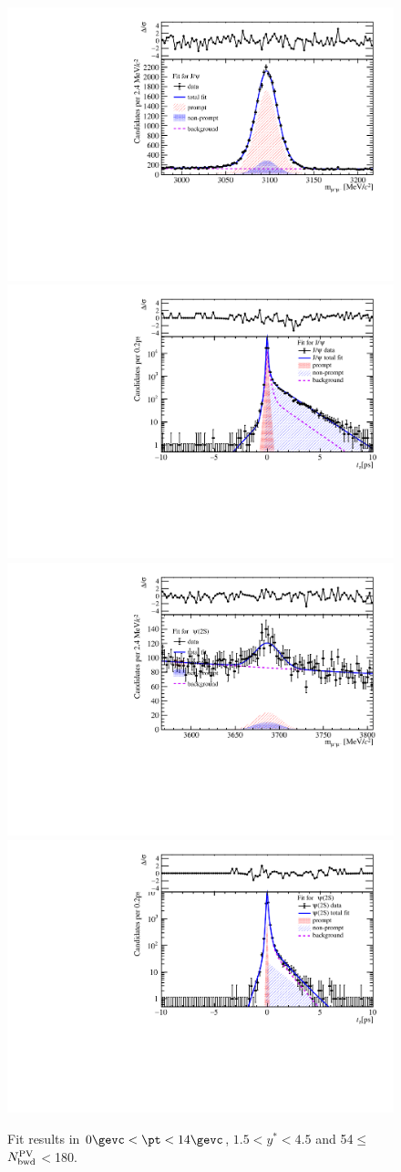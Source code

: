 \begin{figure}[H]
\begin{center}
\includegraphics[width=0.45\linewidth]{pdf/pPb/BWorkdir/TwoDimFit/ProjMass/Jpsi_n5y1pt1.pdf}
\includegraphics[width=0.45\linewidth]{pdf/pPb/BWorkdir/TwoDimFit/ProjTz/Jpsi_n5y1pt1.pdf}
\vspace*{-0.5cm}
\includegraphics[width=0.45\linewidth]{pdf/pPb/BWorkdir/TwoDimFit/ProjMass/Psi2S_n5y1pt1.pdf}
\includegraphics[width=0.45\linewidth]{pdf/pPb/BWorkdir/TwoDimFit/ProjTz/Psi2S_n5y1pt1.pdf}
\vspace*{-0.5cm}
\end{center}
\caption{Fit results in $0\gevc<\pt<14\gevc$, $1.5<y^*<4.5$ and 54$\leq$$N_{\rm bwd}^{\rm PV}$$<$180.}
\end{figure}


